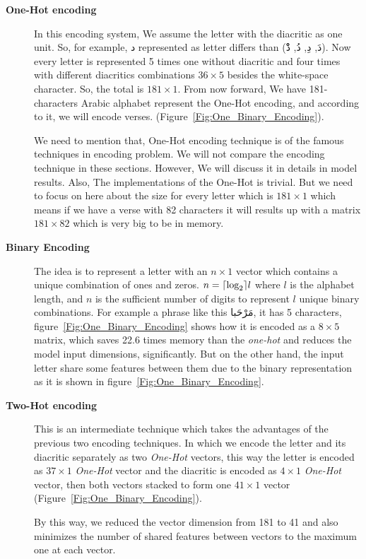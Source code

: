 \begin{description}

  \item[\textbf{One-Hot encoding}] In this encoding system, We assume the letter with the diacritic as one unit. So, for example, \textarabic{د} represented as letter differs than (\textarabic{دَ, دِ, دُ, دْْ}). Now every letter is represented 5 times one without diacritic and four times with different diacritics combinations $36 \times 5$ besides the white-space character. So, the total is $181 \times 1$. From now forward, We have 181-characters Arabic alphabet represent the One-Hot encoding, and according to it, we will encode verses. (Figure~\ref{Fig:One_Binary_Encoding}).

  We need to mention that, One-Hot encoding technique is of the famous techniques in encoding problem. We will not compare the encoding technique in these sections. However, We will discuss it in details in model results. Also, The implementations of the One-Hot is trivial. But we need to focus on here about the size for every letter which is $181 \times 1$ which means if we have a verse with 82 characters it will results up with a matrix $181 \times 82$ which is very big to be in memory.

  \item[\textbf{Binary Encoding}] The idea is to represent a letter with an $n \times 1$ vector which contains a unique combination of ones and zeros.  $n =\ceil*{\log_2} l$ where $l$ is the alphabet length, and $n$ is the sufficient number of digits to represent $l$ unique binary combinations.  For example a phrase like this \textarabic{مَرْحَبا}, it has 5 characters, figure~\ref{Fig:One_Binary_Encoding} shows how it is encoded as a $8 \times 5$ matrix, which saves 22.6 times memory than the \textit{one-hot} and reduces the model input dimensions, significantly. But on the other hand, the input letter share some features between them due to the binary representation as it is shown in figure~\ref{Fig:One_Binary_Encoding}.

  \item[\textbf{Two-Hot encoding}] This is an intermediate technique which takes the advantages of the previous two encoding techniques. In which we encode the letter and its diacritic separately as two \textit{One-Hot} vectors, this way the letter is encoded as $37 \times 1$ \textit{One-Hot} vector and the diacritic is encoded as $4 \times 1$ \textit{One-Hot} vector, then both vectors stacked to form one $41 \times 1$ vector (Figure~\ref{Fig:One_Binary_Encoding}).

  By this way, we reduced the vector dimension from 181 to 41 and also minimizes the number of shared features between vectors to the maximum one at each vector. 
\end{description}

